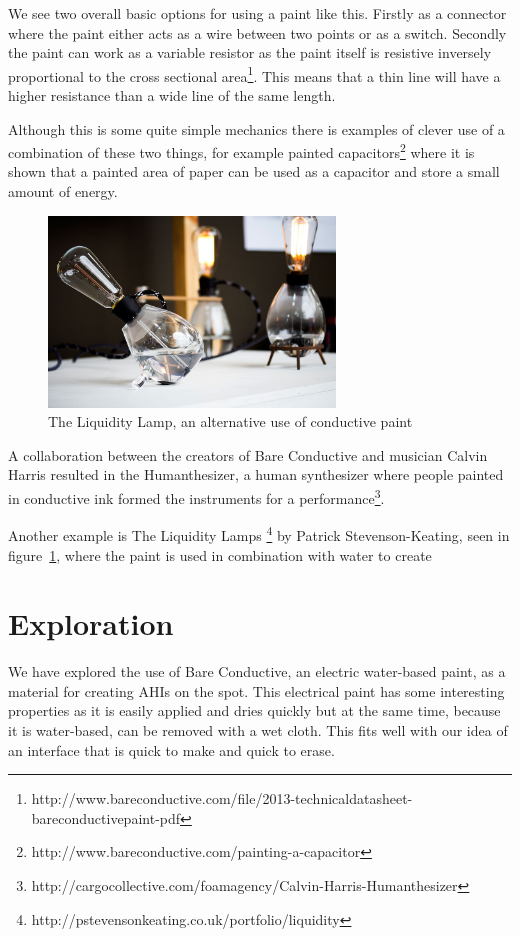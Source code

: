 
We see two overall basic options for using a paint like this.
Firstly as a connector where the paint either acts as a wire between two points or as a switch.
Secondly the paint can work as a variable resistor as the paint itself is resistive inversely proportional to the cross sectional area\footnote{http://www.bareconductive.com/file/2013-technicaldatasheet-bareconductivepaint-pdf}. 
This means that a thin line will have a higher resistance than a wide line of the same length.

Although this is some quite simple mechanics there is examples of clever use of a combination of these two things, for example painted capacitors\footnote{http://www.bareconductive.com/painting-a-capacitor} where it is shown that a painted area of paper can be used as a capacitor and store a small amount of energy.

\begin{figure}[h]
	\centering
  		\includegraphics[width=3in]{figures/proto3/liquidity_lamp}
	\caption{The Liquidity Lamp, an alternative use of conductive paint}
   \label{liquidity_lamp}
\end{figure}

A collaboration between the creators of Bare Conductive and musician Calvin Harris resulted in the Humanthesizer, a human synthesizer where people painted in conductive ink formed the instruments for a performance\footnote{http://cargocollective.com/foamagency/Calvin-Harris-Humanthesizer}.

Another example is The Liquidity Lamps \footnote{http://pstevensonkeating.co.uk/portfolio/liquidity} by Patrick Stevenson-Keating, seen in figure~\ref{liquidity_lamp}, where the paint is used in combination with water to create 


\section{Exploration}
We have explored the use of Bare Conductive, an electric water-based paint, as a material for creating AHIs on the spot.
This electrical paint has some interesting properties as it is easily applied and dries quickly but at the same time, because it is water-based, can be removed with a wet cloth.
This fits well with our idea of an interface that is quick to make and quick to erase.

